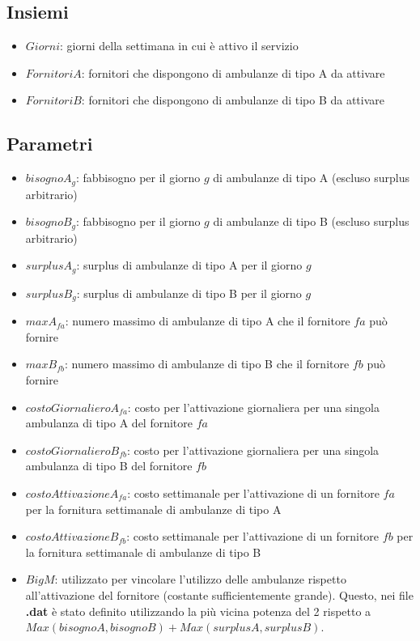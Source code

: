 \subsection{Insiemi}
\begin{itemize}
    \item $Giorni$: giorni della settimana in cui è attivo il servizio
    \item $FornitoriA$: fornitori che dispongono di ambulanze di tipo A da attivare
    \item $FornitoriB$: fornitori che dispongono di ambulanze di tipo B da attivare
\end{itemize}
\subsection{Parametri}
\begin{itemize}
    \item $bisognoA_{g}$: fabbisogno per il giorno $g$ di ambulanze di tipo A (escluso surplus arbitrario)
    \item $bisognoB_{g}$: fabbisogno per il giorno $g$ di ambulanze di tipo B (escluso surplus arbitrario)
    \item $surplusA_{g}$: surplus di ambulanze di tipo A per il giorno $g$
    \item $surplusB_{g}$: surplus di ambulanze di tipo B per il giorno $g$
    \item $maxA_{fa}$: numero massimo di ambulanze di tipo A che il fornitore $fa$ può fornire
    \item $maxB_{fb}$: numero massimo di ambulanze di tipo B che il fornitore $fb$ può fornire
    \item $costoGiornalieroA_{fa}$: costo per l'attivazione giornaliera per una singola ambulanza di tipo A del fornitore $fa$
    \item $costoGiornalieroB_{fb}$: costo per l'attivazione giornaliera per una singola ambulanza di tipo B del fornitore $fb$
    \item $costoAttivazioneA_{fa}$: costo settimanale per l'attivazione di un fornitore $fa$ per la fornitura settimanale di ambulanze di tipo A
    \item $costoAttivazioneB_{fb}$: costo settimanale per l'attivazione di un fornitore $fb$ per la fornitura settimanale di ambulanze di tipo B
    \item $BigM$: utilizzato per vincolare l'utilizzo delle ambulanze rispetto all'attivazione del fornitore (costante sufficientemente grande). Questo, nei file \textbf{.dat} è stato definito utilizzando la più vicina potenza del 2 rispetto a $Max(bisognoA, bisognoB) + Max(surplusA, surplusB)$.
\end{itemize}
